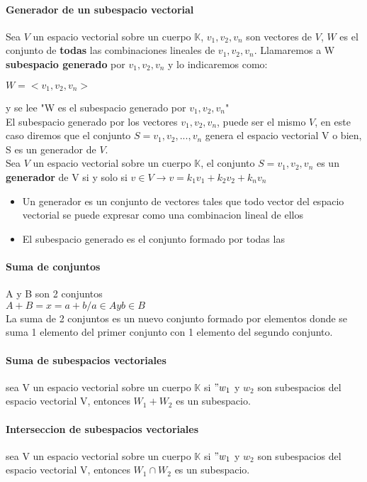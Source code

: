 \documentclass[10pt]{article}
\begin{document}
\paragraph{Generador de un subespacio vectorial} Sea $V$ un espacio vectorial sobre un cuerpo $\mathbb{K}$,
$v_1, v_2, v_n$ son vectores de $V$, $W$ es el conjunto de \textbf{todas} las combinaciones lineales de $v_1, v_2, v_n$.
Llamaremos a W \textbf{subespacio generado} por $v_1,v_2, v_n$ y lo indicaremos como:
\begin{center}
	$W = <v_1, v_2, v_n>$
\end{center}

y se lee "W es el subespacio generado por $v_1, v_2, v_n$"\\
\linebreak
El subespacio generado por los vectores $v_1, v_2, v_n$, puede ser el mismo $V$, en este caso diremos que el conjunto $S = {v_1, v_2,..., v_n}$ genera el espacio vectorial V o bien, S es un generador de $V$.\\
\linebreak
Sea $V$ un espacio vectorial sobre un cuerpo $\mathbb{K}$, el conjunto $S = {v_1, v_2, v_n}$ es un \textbf{generador} de V si y solo si $v \in V \rightarrow v = k_1v_1 + k_2v_2 + k_nv_n$

\begin{itemize}
	\item Un generador es un conjunto de vectores tales que todo vector del espacio vectorial se puede expresar como una combinacion lineal de ellos
	\item El subespacio generado es el conjunto formado por todas las 
\end{itemize}

\paragraph{Suma de conjuntos}
A y B son 2 conjuntos\\
$A+B = {x=a+b / a \in A y b \in B}$\\

La suma de 2 conjuntos es un nuevo conjunto formado por elementos donde se suma 1 elemento del primer conjunto con 1 elemento del segundo conjunto.

\paragraph{Suma de subespacios vectoriales}
sea V un espacio vectorial sobre un cuerpo $\mathbb{K}$ si $"w_1$ y $w_2$ son subespacios del espacio vectorial V, entonces $W_1 + W_2$ es un subespacio.

\paragraph{Interseccion de subespacios vectoriales}
sea V un espacio vectorial sobre un cuerpo $\mathbb{K}$ si $"w_1$ y $w_2$ son subespacios del espacio vectorial V, entonces $W_1 \cap W_2$ es un subespacio.
\end{document}
